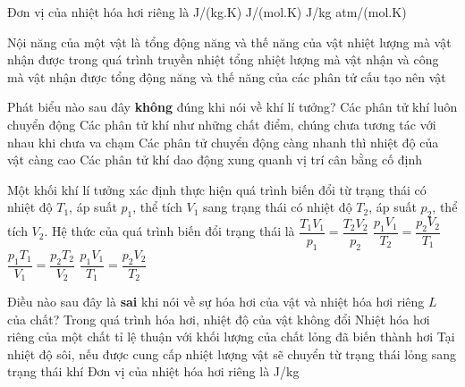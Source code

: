 	\begin{ex}%
		Đơn vị của nhiệt hóa hơi riêng là
		\choice
		{J/(kg.K)}
		{J/(mol.K)}
		{\True J/kg}
		{atm/(mol.K)}
	\end{ex}

	\begin{ex}%
		Nội năng của một vật là
		\choice
		{tổng động năng và thế năng của vật}
		{nhiệt lượng mà vật nhận được trong quá trình truyền nhiệt}
		{tổng nhiệt lượng mà vật nhận và công mà vật nhận được}
		{\True tổng động năng và thế năng của các phân tử cấu tạo nên vật}
	\end{ex}

	\begin{ex}%
		Phát biểu nào sau đây \textbf{không} đúng khi nói về khí lí tưởng?
		\choice
		{Các phân tử khí luôn chuyển động}
		{Các phân tử khí như những chất điểm, chúng chưa tương tác với nhau khi chưa va chạm}
		{Các phân tử chuyển động càng nhanh thì nhiệt độ của vật càng cao}
		{\True Các phân tử khí dao động xung quanh vị trí cân bằng cố định}
	\end{ex}

	\begin{ex}%
		Một khối khí lí tưởng xác định thực hiện quá trình biến đổi từ trạng thái có nhiệt độ $T_1$, áp suất $p_1$, thể tích $V_1$ sang trạng thái có nhiệt độ $T_2$, áp suất $p_2$, thể tích $V_2$. Hệ thức của quá trình biến đổi trạng thái là
		\choice
		{$\dfrac{T_1V_1}{p_1}=\dfrac{T_2V_2}{p_2}$}
		{$\dfrac{p_1V_1}{T_2}=\dfrac{p_2V_2}{T_1}$}
		{$\dfrac{p_1T_1}{V_1}=\dfrac{p_2T_2}{V_2}$}
		{\True $\dfrac{p_1V_1}{T_1}=\dfrac{p_2V_2}{T_2}$}
	\end{ex}

	\begin{ex}%
		Điều nào sau đây là \textbf{sai} khi nói về sự hóa hơi của vật và nhiệt hóa hơi riêng $L$ của chất?
		\choice
		{Trong quá trình hóa hơi, nhiệt độ của vật không đổi}
		{\True Nhiệt hóa hơi riêng của một chất tỉ lệ thuận với khối lượng của chất lỏng đã biến thành hơi}
		{Tại nhiệt độ sôi, nếu được cung cấp nhiệt lượng vật sẽ chuyển từ trạng thái lỏng sang trạng thái khí}
		{Đơn vị của nhiệt hóa hơi riêng là J/kg}
	\end{ex}

